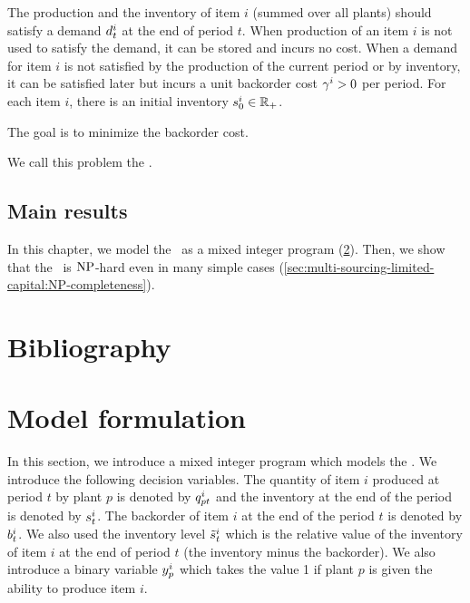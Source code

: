 The production and the inventory of item $i$ (summed over all plants) should satisfy a demand $d_t^i$ at the end of period $t$.
When production of an item $i$ is not used to satisfy the demand, it can be stored and incurs no cost.
When a demand for item $i$ is not satisfied by the production of the current period or by inventory, it can be satisfied later but incurs a unit backorder cost $\gamma^i>0$ per period.
For each item $i$, there is an initial inventory $s_0^i\in\mathbb{R}_+$.


The goal is to minimize the backorder cost.


We call this problem the \emph{\tbc}.



\subsection{Main results}


In this chapter, we model the \tbc\ as a mixed integer program (\cref{sec:multi-sourcing-limited-capital:model-formulation}).
Then, we show that the \tbc\ is $\operatorname{NP}$-hard even in many simple cases (\cref{sec:multi-sourcing-limited-capital:NP-completeness}).


\section{Bibliography}




\section{Model formulation}
\label{sec:multi-sourcing-limited-capital:model-formulation}


In this section, we introduce a mixed integer program which models the \tbc.
We introduce the following decision variables.
The quantity of item $i$ produced at period $t$ by plant $p$ is denoted by $q_{pt}^i$ and the inventory at the end of the period is denoted by $s_t^i$.
The backorder of item $i$ at the end of the period $t$ is denoted by $b_t^i$.
We also used the inventory level $\tilde{s}_t^i$ which is the relative value of the inventory of item $i$ at the end of period $t$ (\ie the inventory minus the backorder).
We also introduce a binary variable $y_p^i$ which takes the value 1 if plant $p$ is given the ability to produce item $i$.


